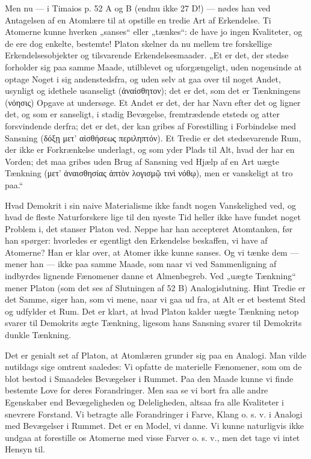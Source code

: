 \documentclass[12pt,a4paper,openany]{book}
\newcommand{\opage}[1]{\marginnote{\footnotesize\textit{[#1]}}}
\begin{document}
Men nu --- i Timaios p. 52 A og B (endnu ikke 27 D!)
--- nødes han ved Antagelsen af en Atomlære til at opstille en
tredie Art af Erkendelse. Ti Atomerne kunne hverken „sanses“
eller „tænkes“: de have jo ingen Kvaliteter, og de ere dog
enkelte, bestemte! Platon skelner da nu mellem tre forskellige
Erkendelsesobjekter og tilsvarende Erkendelsesmaader. „Et er
det, der stedse forholder sig paa samme Maade, utilblevet og
uforgængeligt, uden nogensinde at optage Noget i sig andenstedsfra,
og uden selv at gaa over til noget Andet, usynligt og
idethele usanseligt (ἀναίσθητον); det er det, som det er Tænkningens
(νόησις) Opgave at undersøge. Et Andet er det, der har
Navn efter det og ligner det, og som er sanseligt, i stadig Bevægelse,
fremtrædende etsteds og atter forsvindende derfra; det
er det, der kan gribes af Forestilling i Forbindelse med Sansning
(δόξῃ μετ' αἰσθήσεως περιληπτόν). Et Tredie er det stedsevarende
Rum, der ikke er Forkrænkelse underlagt, og som yder
Plads til Alt, hvad der har en Vorden; det maa gribes uden
Brug af Sansning ved Hjælp af en Art uægte Tænkning (μετ'
ἀναισθησίας ἁπτὸν λογισμῷ τινὶ νόθῳ), men er vanskeligt at
tro paa.“

Hvad Demokrit i sin naive Materialisme ikke fandt nogen
Vanskelighed ved, og hvad de fleste Naturforskere lige til den
nyeste Tid heller ikke have fundet noget Problem i, det stanser
Platon ved. Neppe har han accepteret Atomtanken, før han
spørger: hvorledes er egentligt den Erkendelse beskaffen, vi
have af Atomerne? Han er klar over, at Atomer ikke kunne
sanses. Og vi tænke dem --- mener han --- ikke paa samme
Maade, som naar vi ved Sammenligning af indbyrdes lignende
Fænomener danne et Almenbegreb. Ved „uægte Tænkning“
mener Platon (som det ses af Slutningen af 52 B) Analogislutning.
Hint Tredie er det Samme, siger han, som vi mene, naar
vi gaa ud fra, at Alt er et bestemt Sted og udfylder et Rum.
Det er klart, at hvad Platon kalder uægte Tænkning netop svarer
til Demokrits ægte Tænkning, ligesom hans Sansning svarer
til Demokrits dunkle Tænkning.

\setcounter{footnote}{0}%
\opage{100}Det er genialt set af Platon, at Atomlæren grunder sig paa
en Analogi. Man vilde nutildags sige omtrent saaledes: Vi opfatte
de materielle Fænomener, som om de blot bestod i Smaadeles
Bevægelser i Rummet. Paa den Maade kunne vi finde
bestemte Love for deres Forandringer. Men saa se vi bort fra
alle andre Egenskaber end Bevægeligheden og Deleligheden,
altsaa fra alle Kvaliteter i snevrere Forstand. Vi betragte alle
Forandringer i Farve, Klang o. s. v. i Analogi med Bevægelser
i Rummet. Det er en Model, vi danne. Vi kunne naturligvis
ikke undgaa at forestille os Atomerne med visse Farver o. s. v.,
men det tage vi intet Hensyn til.
\end{document}

